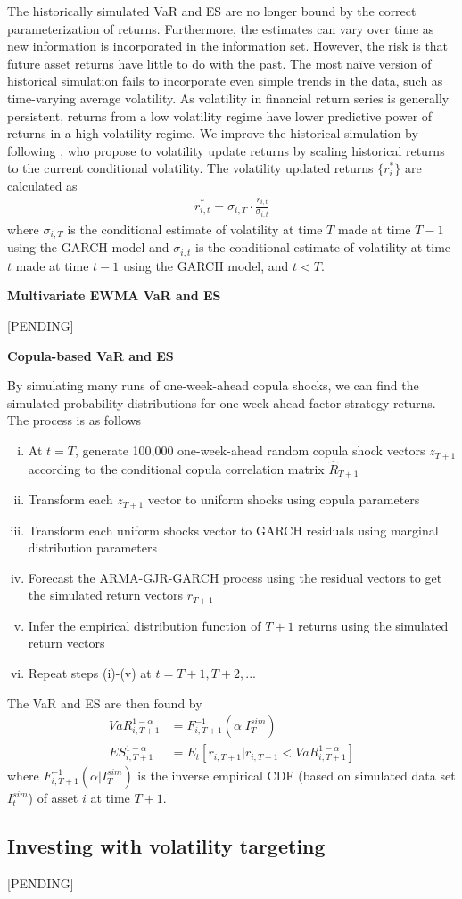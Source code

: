 The historically simulated VaR and ES are no longer bound by the correct parameterization of returns. Furthermore, the estimates can vary over time as new information is incorporated in the information set. However, the risk is that future asset returns have little to do with the past. The most naïve version of historical simulation fails to incorporate even simple trends in the data, such as time-varying average volatility. As volatility in financial return series is generally persistent, returns from a low volatility regime have lower predictive power of returns in a high volatility regime. We improve the historical simulation by following \textcite{HullWhite1998}, who propose to volatility update returns by scaling historical returns to the current conditional volatility. The volatility updated returns $\{r^*_i\}$ are calculated as
\begin{align}
    r^*_{i, t} = \sigma_{i,T} \cdot \frac{r_{i,t}}{\sigma_{i,t}}
\end{align}
where $\sigma_{i,T}$ is the conditional estimate of volatility at time $T$ made at time $T-1$ using the GARCH model and $\sigma_{i,t}$ is the conditional estimate of volatility at time $t$ made at time $t-1$ using the GARCH model, and $t<T$.

\textbf{Multivariate EWMA VaR and ES}

[PENDING]

\textbf{Copula-based VaR and ES}

By simulating many runs of one-week-ahead copula shocks, we can find the simulated probability distributions for one-week-ahead factor strategy returns. The process is as follows
\begin{enumerate}[(i)]
    \item At $t = T$, generate 100,000 one-week-ahead random copula shock vectors $z_{T+1}$ according to the conditional copula correlation matrix $\hat{R}_{T+1}$
    \item Transform each $z_{T+1}$ vector to uniform shocks using copula parameters
    \item Transform each uniform shocks vector to GARCH residuals using marginal distribution parameters
    \item Forecast the ARMA-GJR-GARCH process using the residual vectors to get the simulated return vectors $r_{T+1}$
    \item Infer the empirical distribution function of $T+1$ returns using the simulated return vectors
    \item Repeat steps (i)-(v) at $t = T+1, T+2, ...$
\end{enumerate}
The VaR and ES are then found by
\begin{align}
    VaR_{i,T+1}^{1-\alpha} &= F_{i, T+1}^{-1}(\alpha | I^{sim}_T) \\
    ES_{i, T+1}^{1 - \alpha} &= E_t[r_{i,T+1} | r_{i,T+1} < VaR_{i,T+1}^{1-\alpha}]
\end{align}
where $F_{i, T+1}^{-1}(\alpha | I^{sim}_T)$ is the inverse empirical CDF (based on simulated data set $I^{sim}_t$) of asset $i$ at time $T+1$.

\subsection{Investing with volatility targeting}

[PENDING]